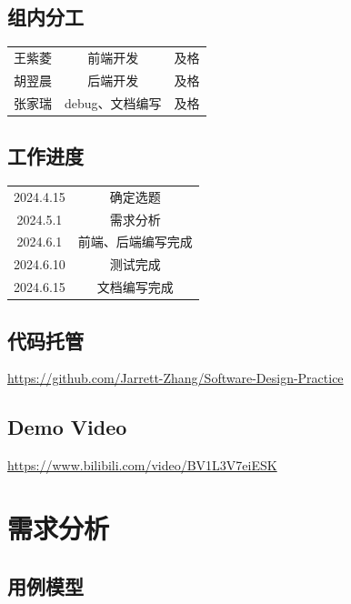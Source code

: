 \documentclass{article}
\begin{document}
\subsection{组内分工}
\begin{center}
\begin{tabular}{c|c|c}
王紫菱 & 前端开发 & 及格\\
胡翌晨 & 后端开发 & 及格\\
张家瑞 & debug、文档编写 & 及格
\end{tabular}
\end{center}

\subsection{工作进度}
\begin{center}
\begin{tabular}{c|c}
2024.4.15 & 确定选题\\
2024.5.1 & 需求分析\\
2024.6.1 & 前端、后端编写完成\\
2024.6.10 & 测试完成\\
2024.6.15 & 文档编写完成
\end{tabular}
\end{center}

\subsection{代码托管}
\href{https://github.com/Jarrett-Zhang/Software-Design-Practice}{https://github.com/Jarrett-Zhang/Software-Design-Practice}

\subsection{Demo Video}
\href{https://www.bilibili.com/video/BV1L3V7eiESK}
{https://www.bilibili.com/video/BV1L3V7eiESK}

\section{需求分析}

\subsection{用例模型}
\end{document}
